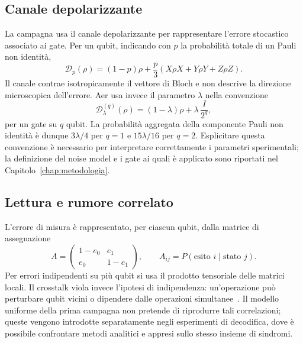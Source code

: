 \begin{onehalfspace}
\subsection{Canale depolarizzante}

La campagna usa il canale depolarizzante per rappresentare l'errore stocastico associato ai gate. Per un qubit, indicando con $p$ la probabilità totale di un Pauli non identità,
\begin{equation}
    \mathcal{D}_{p}(\rho)
    =(1-p)\rho+\frac{p}{3}
      \left(X\rho X+Y\rho Y+Z\rho Z\right).
    \label{eq:depolarizing}
\end{equation}
Il canale contrae isotropicamente il vettore di Bloch e non descrive la direzione microscopica dell'errore. Aer usa invece il parametro $\lambda$ nella convenzione
\begin{equation}
    \mathcal{D}_{\lambda}^{(q)}(\rho)
    =(1-\lambda)\rho+\lambda\,\frac{I}{2^q},
    \label{eq:depolarizing_compact}
\end{equation}
per un gate su $q$ qubit. La probabilità aggregata della componente Pauli non identità è dunque $3\lambda/4$ per $q=1$ e $15\lambda/16$ per $q=2$. Esplicitare questa convenzione è necessario per interpretare correttamente i parametri sperimentali; la definizione del noise model e i gate ai quali è applicato sono riportati nel Capitolo~\ref{chap:metodologia}.

\subsection{Lettura e rumore correlato}

L'errore di misura è rappresentato, per ciascun qubit, dalla matrice di assegnazione
\begin{equation}
    A=
    \begin{pmatrix}
        1-e_0 & e_1\\
        e_0   & 1-e_1
    \end{pmatrix},
    \qquad
    A_{ij}=P(\text{esito }i\mid\text{stato }j).
\end{equation}
Per errori indipendenti su più qubit si usa il prodotto tensoriale delle matrici locali. Il crosstalk viola invece l'ipotesi di indipendenza: un'operazione può perturbare qubit vicini o dipendere dalle operazioni simultanee~\cite{sarovar2020}. Il modello uniforme della prima campagna non pretende di riprodurre tali correlazioni; queste vengono introdotte separatamente negli esperimenti di decodifica, dove è possibile confrontare metodi analitici e appresi sullo stesso insieme di sindromi.


\end{onehalfspace}
